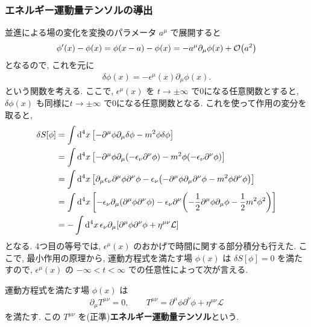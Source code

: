 \documentclass[../note01.tex]{subfiles}
\begin{document}
\subsubsection{エネルギー運動量テンソルの導出}
並進による場の変化を変換のパラメータ $ a^\mu $ で展開すると
\begin{align*}
    \phi'(x)-\phi(x) = \phi(x-a)-\phi(x) = -a^\mu\partial_\mu\phi(x)+\order{a^2}
\end{align*}
となるので, これを元に
\begin{align}
    \delta\phi(x)=-\epsilon^\mu(x)\partial_\mu\phi(x).
\end{align}
という関数を考える. ここで, $ \epsilon^\mu(x) $ を $ t\to\pm\infty $ で0になる任意関数とすると, $ \delta\phi(x) $ も同様に$ t\to\pm\infty $ で0になる任意関数となる.
これを使って作用の変分を取ると,
\begin{align*}
    \delta S[\phi] &= \int\dd[4]{x} \qty[-\partial^\mu\phi\partial_\mu\delta\phi - m^2\phi\delta\phi] \\
    &= \int\dd[4]{x} \qty[-\partial^\mu\phi\partial_\mu(-\epsilon_\nu\partial^\nu\phi) - m^2\phi(-\epsilon_\nu\partial^\nu\phi)] \\
    &= \int\dd[4]{x} \qty[\partial_\mu\epsilon_\nu\partial^\mu\phi\partial^\nu\phi - \epsilon_\nu\qty(-\partial^\mu\phi\partial_\mu\partial^\nu\phi - m^2\phi\partial^\nu\phi)] \\
    &= \int\dd[4]{x} \qty[-\epsilon_\nu\partial_\mu(\partial^\mu\phi\partial^\nu\phi) -\epsilon_\nu\partial^\nu\qty(-\frac{1}{2}\partial^\mu\phi\partial_\mu\phi-\frac{1}{2}m^2\phi^2)] \\
    &= -\int\dd[4]{x} \epsilon_\nu\partial_\mu\qty[\partial^\mu\phi\partial^\nu\phi + \eta^{\mu\nu}\mathcal{L}]
\end{align*}
となる. 4つ目の等号では, $ \epsilon^\mu(x) $ のおかげで時間に関する部分積分も行えた.
ここで, 最小作用の原理から, 運動方程式を満たす場 $ \phi(x) $ は $ \delta S[\phi]=0 $ を満たすので, $ \epsilon^\mu(x) $ の $ -\infty<t<\infty $ での任意性によって次が言える.
\begin{kekka}
    運動方程式を満たす場 $ \phi(x) $ は
    \begin{align}\label{EMT}
        \partial_\mu T^{\mu\nu}=0, \qquad T^{\mu\nu} = \partial^\mu\phi\partial^\nu\phi + \eta^{\mu\nu}\mathcal{L}
    \end{align}
    を満たす. この $ T^{\mu\nu} $ を(正準)\textbf{エネルギー運動量テンソル}という.
\end{kekka}
\end{document}
